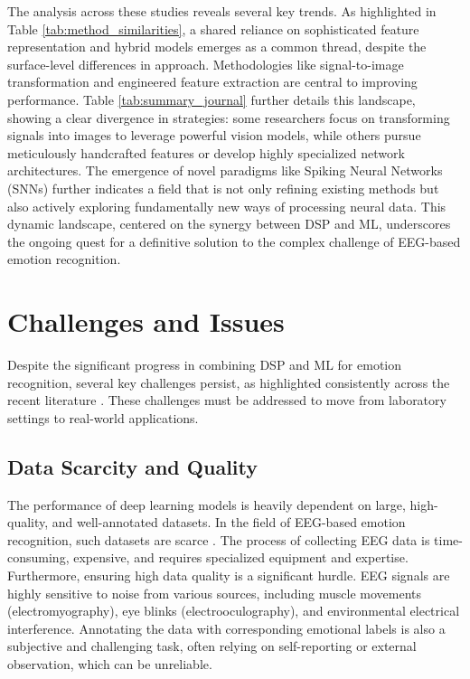 \documentclass[conference]{IEEEtran}
\begin{document}
The analysis across these studies reveals several key trends. As highlighted in Table \ref{tab:method_similarities}, a shared reliance on sophisticated feature representation and hybrid models emerges as a common thread, despite the surface-level differences in approach. Methodologies like signal-to-image transformation and engineered feature extraction are central to improving performance. Table \ref{tab:summary_journal} further details this landscape, showing a clear divergence in strategies: some researchers focus on transforming signals into images to leverage powerful vision models, while others pursue meticulously handcrafted features or develop highly specialized network architectures. The emergence of novel paradigms like Spiking Neural Networks (SNNs) \cite{b5} further indicates a field that is not only refining existing methods but also actively exploring fundamentally new ways of processing neural data. This dynamic landscape, centered on the synergy between DSP and ML, underscores the ongoing quest for a definitive solution to the complex challenge of EEG-based emotion recognition.



\section{Challenges and Issues}
Despite the significant progress in combining DSP and ML for emotion recognition, several key challenges persist, as highlighted consistently across the recent literature \cite{b6, b7, b8}. These challenges must be addressed to move from laboratory settings to real-world applications.

\subsection*{Data Scarcity and Quality}
The performance of deep learning models is heavily dependent on large, high-quality, and well-annotated datasets. In the field of EEG-based emotion recognition, such datasets are scarce \cite{b8}. The process of collecting EEG data is time-consuming, expensive, and requires specialized equipment and expertise. Furthermore, ensuring high data quality is a significant hurdle. EEG signals are highly sensitive to noise from various sources, including muscle movements (electromyography), eye blinks (electrooculography), and environmental electrical interference. Annotating the data with corresponding emotional labels is also a subjective and challenging task, often relying on self-reporting or external observation, which can be unreliable.
\end{document}
